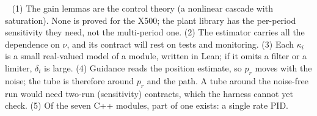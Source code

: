 \documentclass[10pt]{article}
\newcommand{\head}[1]{\par\vspace{2pt}{\color{accent}\bfseries #1}\ }
\begin{document}
\head{What is hard.}
(1) The gain lemmas are the control theory (a nonlinear cascade with saturation). None is proved for the X500; the plant library has the per-period sensitivity they need, not the multi-period one.
(2) The estimator carries all the dependence on $\nu$, and its contract will rest on tests and monitoring.
(3) Each $\kappa_i$ is a small real-valued model of a module, written in Lean; if it omits a filter or a limiter, $\delta_i$ is large.
(4) Guidance reads the position estimate, so $p_r$ moves with the noise; the tube is therefore around $p_r$ and the path. A tube around the noise-free run would need two-run (sensitivity) contracts, which the harness cannot yet check.
(5) Of the seven C++ modules, part of one exists: a single rate PID.
\end{document}
